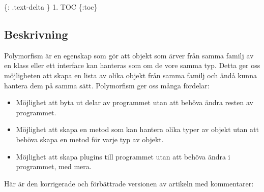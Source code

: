 \{: .text-delta \} 1. TOC \{:toc\}

\hypertarget{beskrivning}{%
\subsection{Beskrivning}\label{beskrivning}}

Polymorfism är en egenskap som gör att objekt som ärver från samma
familj av en klass eller ett interface kan hanteras som om de vore samma
typ. Detta ger oss möjligheten att skapa en lista av olika objekt från
samma familj och ändå kunna hantera dem på samma sätt. Polymorfism ger
oss många fördelar:

\begin{itemize}
\tightlist
\item
  Möjlighet att byta ut delar av programmet utan att behöva ändra resten
  av programmet.
\item
  Möjlighet att skapa en metod som kan hantera olika typer av objekt
  utan att behöva skapa en metod för varje typ av objekt.
\item
  Möjlighet att skapa plugins till programmet utan att behöva ändra i
  programmet, med mera.
\end{itemize}

Här är den korrigerade och förbättrade versionen av artikeln med
kommentarer:

\hypertarget{cb1}{}
\begin{Shaded}
\begin{Highlighting}[]





\NormalTok{:}

\OperatorTok{\{}
 \OperatorTok{();}
 \OperatorTok{();}
 \OperatorTok{();}
 \OperatorTok{();}
\OperatorTok{\}}
\end{Highlighting}
\end{Shaded}

